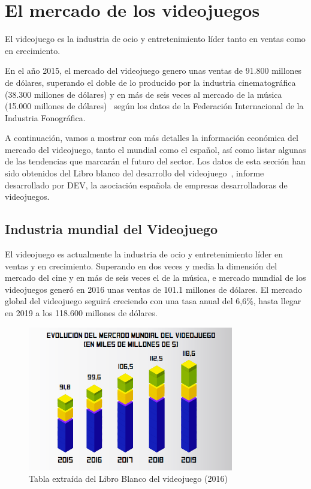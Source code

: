 \section{El mercado de los videojuegos}
El videojuego es la industria de ocio y entretenimiento líder tanto en ventas como en crecimiento.

En el año 2015, el mercado del videojuego genero unas ventas de 91.800 millones de dólares, superando el doble de lo producido por la industria cinematográfica (38.300 millones de dólares) y en más de seis veces al mercado de la música (15.000 millones de dólares)~\cite{libro_blanco} según los datos de la Federación Internacional de la Industria Fonográfica.

A continuación, vamos a mostrar con más detalles la información económica del mercado del videojuego, tanto el mundial como el español, así como listar algunas de las tendencias que marcarán el futuro del sector. Los datos de esta sección han sido obtenidos del Libro blanco del desarrollo del videojuego~\cite{libro_blanco}, informe desarrollado por DEV, la asociación española de empresas desarrolladoras de videojuegos.

\subsection{Industria mundial del Videojuego}
El videojuego es actualmente la industria de ocio y entretenimiento líder en ventas y en crecimiento. Superando en dos veces y media la dimensión del mercado del cine y en más de seis veces el de la música, e mercado mundial de los videojuegos generó en 2016 unas ventas de 101.1 millones de dólares. El mercado global del videojuego seguirá creciendo con una tasa anual del 6,6\%, hasta llegar en 2019 a los 118.600 millones de dólares.
\begin{figure}[h]
	\includegraphics[width=0.8\textwidth]{images/estadodelarte/mercado/crecimiento_mercado_mundial}
	\centering
	\caption{Tabla extraída del Libro Blanco del videojuego (2016)}
\end{figure}

